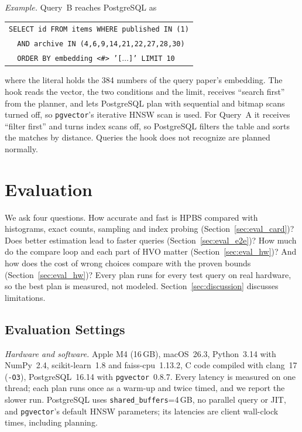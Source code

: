 \documentclass[sigconf, nonacm]{acmart}
\begin{document}
\emph{Example.} Query~B reaches PostgreSQL as
\begin{center}
\footnotesize
\begin{tabular}{@{}l@{}}
\texttt{SELECT id FROM items WHERE published IN (1)}\\
\texttt{\ \ AND archive IN (4,6,9,14,21,22,27,28,30)}\\
\texttt{\ \ ORDER BY embedding <\#> '[$\ldots$]' LIMIT 10}
\end{tabular}
\end{center}
where the literal holds the 384 numbers of the query paper's embedding. The hook reads the vector, the two conditions and the limit, receives ``search first'' from the planner, and lets PostgreSQL plan with sequential and bitmap scans turned off, so \texttt{pgvector}'s iterative HNSW scan is used. For Query~A it receives ``filter first'' and turns index scans off, so PostgreSQL filters the table and sorts the matches by distance. Queries the hook does not recognize are planned normally.

\section{Evaluation}\label{sec:eval}
We ask four questions. How accurate and fast is HPBS compared with histograms, exact counts, sampling and index probing (Section~\ref{sec:eval_card})? Does better estimation lead to faster queries (Section~\ref{sec:eval_e2e})? How much do the compare loop and each part of HVO matter (Section~\ref{sec:eval_hw})? And how does the cost of wrong choices compare with the proven bounds (Section~\ref{sec:eval_hw})? Every plan runs for every test query on real hardware, so the best plan is measured, not modeled. Section~\ref{sec:discussion} discusses limitations.

\subsection{Evaluation Settings}\label{sec:setup}
\emph{Hardware and software.} Apple M4 (16\,GB), macOS~26.3, Python~3.14 with NumPy~2.4, scikit-learn~1.8 and faiss-cpu~1.13.2, C code compiled with clang~17 (\texttt{-O3}), PostgreSQL~16.14 with \texttt{pgvector}~0.8.7. Every latency is measured on one thread; each plan runs once as a warm-up and twice timed, and we report the slower run. PostgreSQL uses \texttt{shared\_buffers}=4\,GB, no parallel query or JIT, and \texttt{pgvector}'s default HNSW parameters; its latencies are client wall-clock times, including planning.
\end{document}
